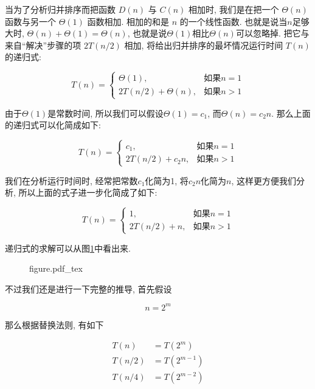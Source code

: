 \documentclass[oneside,10pt,fontset=none]{ctexbook}
\numberwithin{definition}{chapter}
\numberwithin{theorem}{chapter}
\numberwithin{lemma}{chapter}
\begin{document}
当为了分析归并排序而把函数 $D(n)$ 与 $C(n)$ 相加时, 我们是在把一个 $\Theta(n)$ 函数与另一个 $\Theta(1)$ 函数相加. 相加的和是 $n$ 的一个线性函数. 也就是说当$n$足够大时, $\Theta(n)+\Theta(1)=\Theta(n)$, 也就是说$\Theta(1)$相比$\Theta(n)$可以忽略掉. 把它与来自``解决''步骤的项 $2T(n/2)$ 相加, 将给出归并排序的最坏情况运行时间 $T(n)$ 的递归式:

\begin{equation*}
    T(n) = \begin{cases}
        \Theta(1), &\text{如果} n = 1 \\
        2T(n/2) + \Theta(n), &\text{如果} n > 1
    \end{cases}
\end{equation*}

由于$\Theta(1)$是常数时间, 所以我们可以假设$\Theta(1)=c_1$, 而$\Theta(n)=c_2n$. 那么上面的递归式可以化简成如下:

\begin{equation*}
    T(n) = \begin{cases}
        c_1, &\text{如果} n = 1 \\
        2T(n/2) + c_2n, &\text{如果} n > 1
    \end{cases}
\end{equation*}

我们在分析运行时间时, 经常把常数$c_1$化简为1, 将$c_2n$化简为$n$, 这样更方便我们分析, 所以上面的式子进一步化简成了如下:

\begin{equation*}
    T(n) = \begin{cases}
        1, &\text{如果} n = 1 \\
        2T(n/2) + n, &\text{如果} n > 1
    \end{cases}
\end{equation*}

递归式的求解可以从图\ref{fig:归并排序的递归树}中看出来.

\begin{figure}[htbp]
    \def\svgwidth{\columnwidth}
    {figure.pdf_tex}
    \label{fig:归并排序的递归树}
\end{figure}

不过我们还是进行一下完整的推导, 首先假设

\begin{equation*}
    n = 2^m
\end{equation*}

那么根据替换法则, 有如下

\begin{equation*}\begin{split}
T(n)   &= T(2^m)     \\
T(n/2) &= T(2^{m-1}) \\
T(n/4) &= T(2^{m-2})
\end{split}\end{equation*}
\end{document}

